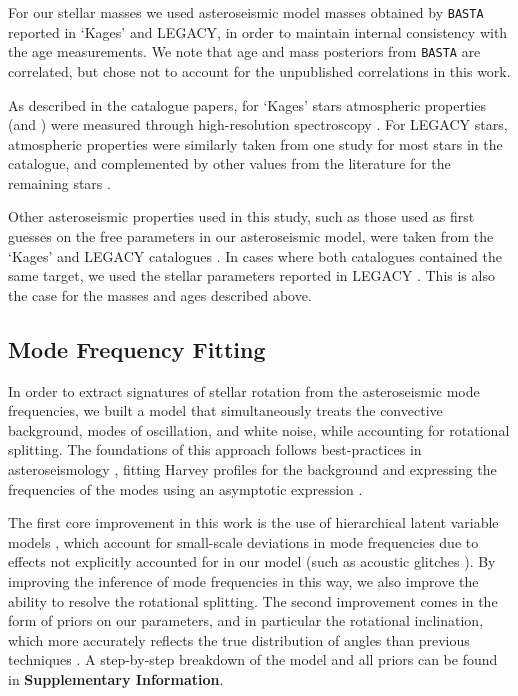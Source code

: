 For our stellar masses we used asteroseismic model masses obtained by \texttt{BASTA} reported in `Kages' and LEGACY, in order to maintain internal consistency with the age measurements. We note that age and mass posteriors from \texttt{BASTA} are correlated, but chose not to account for the unpublished correlations in this work.

As described in the catalogue papers, for `Kages' stars atmospheric properties (\teff and \feh) were measured through high-resolution spectroscopy \cite{huber+2013a}. For LEGACY stars, atmospheric properties were similarly taken from one study \cite{buchhave+latham2015} for most stars in the catalogue, and complemented by other values from the literature for the remaining stars \cite[see Table 3]{m_silvaaguirre+2017}.

Other asteroseismic properties used in this study, such as those used as first guesses on the free parameters in our asteroseismic model, were taken from the `Kages' and LEGACY catalogues \cite{astropycollaboration+2013, m_astropycollaboration+2018, m_ginsburg+2019}. In cases where both catalogues contained the same target, we used the stellar parameters reported in LEGACY \cite{mckinney2010}. This is also the case for the masses and ages described above.

\subsection{Mode Frequency Fitting}

In order to extract signatures of stellar rotation from the asteroseismic mode frequencies, we built a model that simultaneously treats the convective background, modes of oscillation, and white noise, while accounting for rotational splitting. The foundations of this approach follows best-practices in asteroseismology \cite{davies+2015}, fitting Harvey profiles for the background \cite{harvey1985} and expressing the frequencies of the modes using an asymptotic expression \cite{tassoul1980, m_vrard+2016}.

The first core improvement in this work is the use of hierarchical latent variable models \cite{hogg+2010, m_hall+2019}, which account for small-scale deviations in mode frequencies due to effects not explicitly accounted for in our model (such as acoustic glitches \cite{mazumdar+2014}). By improving the inference of mode frequencies in this way, we also improve the ability to resolve the rotational splitting. The second improvement comes in the form of priors on our parameters, and in particular the rotational inclination, which more accurately reflects the true distribution of angles than previous techniques \cite{chaplin+basu2017}. A step-by-step breakdown of the model and all priors can be found in \textbf{Supplementary Information}.\\

